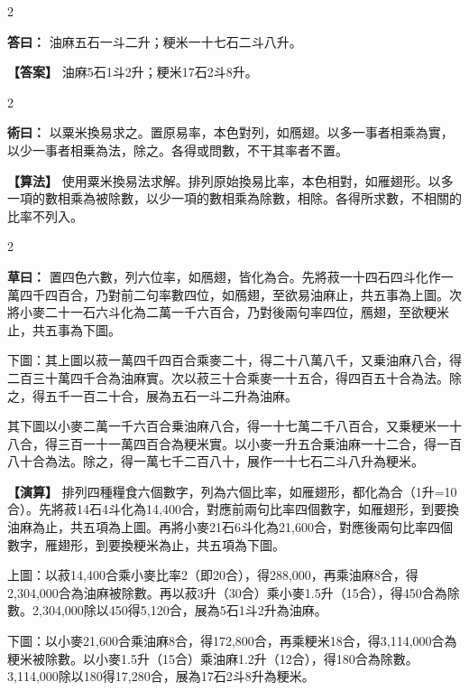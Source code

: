 \documentclass[11pt,a4paper]{article}
\newcommand{\ClassicalAnswer}[1]{\par\noindent\textbf{\color{answercolor}答曰：}#1\par}
\newcommand{\ClassicalMethod}[1]{\par\noindent\textbf{\color{methodcolor}術曰：}#1\par}
\newcommand{\ClassicalWorking}[1]{\par\noindent\textbf{草曰：}#1\par}
\newcommand{\ModernAnswer}[1]{\par\noindent\textbf{\color{answercolor}【答案】}#1\par}
\newcommand{\ModernMethod}[1]{\par\noindent\textbf{\color{methodcolor}【算法】}#1\par}
\newcommand{\ModernWorking}[1]{\par\noindent\textbf{【演算】}#1\par}
\begin{document}
\begin{paracol}{2}

\ClassicalAnswer{%
油麻五石一斗二升；粳米一十七石二斗八升。}

\switchcolumn

\ModernAnswer{%
油麻5石1斗2升；粳米17石2斗8升。
}

\end{paracol}

\begin{paracol}{2}

\ClassicalMethod{%
以粟米換易求之。置原易率，本色對列，如鴈翅。以多一事者相乘為實，以少一事者相乗為法，除之。各得或問數，不干其率者不置。}

\switchcolumn

\ModernMethod{%
使用粟米換易法求解。排列原始換易比率，本色相對，如雁翅形。以多一項的數相乘為被除數，以少一項的數相乘為除數，相除。各得所求數，不相關的比率不列入。
}

\end{paracol}

\begin{paracol}{2}

\ClassicalWorking{%
置四色六數，列六位率，如鴈翅，皆化為合。先將菽一十四石四斗化作一萬四千四百合，乃對前二句率數四位，如鴈翅，至欲易油麻止，共五事為上圖。次將小麥二十一石六斗化為二萬一千六百合，乃對後兩句率四位，鴈翅，至欲粳米止，共五事為下圖。

下圖：其上圖以菽一萬四千四百合乘麥二十，得二十八萬八千，又乗油麻八合，得二百三十萬四千合為油麻實。次以菽三十合乘麥一十五合，得四百五十合為法。除之，得五千一百二十合，展為五石一斗二升為油麻。

其下圖以小麥二萬一千六百合乗油麻八合，得一十七萬二千八百合，又乗粳米一十八合，得三百一十一萬四百合為粳米實。以小麥一升五合乗油麻一十二合，得一百八十合為法。除之，得一萬七千二百八十，展作一十七石二斗八升為粳米。}

\switchcolumn

\ModernWorking{%
排列四種糧食六個數字，列為六個比率，如雁翅形，都化為合（1升=10合）。先將菽14石4斗化為14,400合，對應前兩句比率四個數字，如雁翅形，到要換油麻為止，共五項為上圖。再將小麥21石6斗化為21,600合，對應後兩句比率四個數字，雁翅形，到要換粳米為止，共五項為下圖。

上圖：以菽14,400合乘小麥比率2（即20合），得288,000，再乘油麻8合，得2,304,000合為油麻被除數。再以菽3升（30合）乘小麥1.5升（15合），得450合為除數。2,304,000除以450得5,120合，展為5石1斗2升為油麻。

下圖：以小麥21,600合乘油麻8合，得172,800合，再乘粳米18合，得3,114,000合為粳米被除數。以小麥1.5升（15合）乘油麻1.2升（12合），得180合為除數。3,114,000除以180得17,280合，展為17石2斗8升為粳米。
}

\end{paracol}
\end{document}
